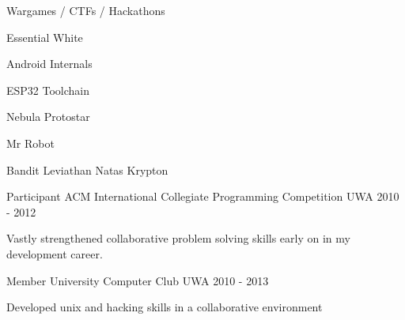 \begin{cventries}
    \cventry
        {Wargames / CTFs / Hackathons}
        {}
        {}
        {}
        {
          \begin{cvitems}
            \item { \acvSubItemSep Essential \acvSubItemSep White}
            \item { }
            \item { \acvSubItemSep Android Internals}
            \item { \acvSubItemSep ESP32 Toolchain}
            \item { \acvSubItemSep Nebula \acvSubItemSep Protostar}
            \item { \acvSubItemSep Mr Robot}
            \item { \acvSubItemSep Bandit \acvSubItemSep Leviathan \acvSubItemSep Natas \acvSubItemSep Krypton}
          \end{cvitems}
        }

  \cventry
    {Participant} %
    {ACM International Collegiate Programming Competition} %
    {UWA} %
    {2010 - 2012} %
    {
      \begin{cvitems} %
        \item {Vastly strengthened collaborative problem solving skills early on in my development career.}
      \end{cvitems}
    }

  \cventry
    {Member} %
    {University Computer Club} %
    {UWA} %
    {2010 - 2013} %
    {
      \begin{cvitems} %
        \item {Developed unix and hacking skills in a collaborative environment}
      \end{cvitems}
    }

\end{cventries}
